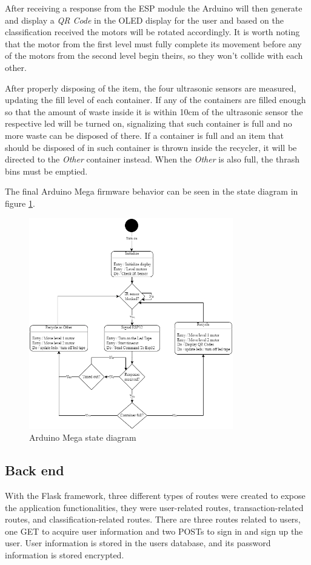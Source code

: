 \documentclass[a4paper,11pt]{article}
\begin{document}
After receiving a response from the ESP module the Arduino will then generate and display a \textit{QR Code} in the OLED display for the user and based on the classification received the motors will be rotated accordingly. It is worth noting that the motor from the first level must fully complete its movement before any of the motors from the second level begin theirs, so they won't collide with each other.

After properly disposing of the item, the four ultrasonic sensors are measured, updating the fill level of each container. If any of the containers are filled enough so that the amount of waste inside it is within 10cm of the ultrasonic sensor the respective led will be turned on, signalizing that such container is full and no more waste can be disposed of there. If a container is full and an item that should be disposed of in such container is thrown inside the recycler, it will be directed to the \textit{Other} container instead. When the \textit{Other} is also full, the thrash bins must be emptied.

The final Arduino Mega firmware behavior can be seen in the state diagram in figure \ref{fig:arduinoState}.

\begin{figure}[H]
  \centering
  \includegraphics[width=8.9cm]{Figures/State chart Arduino Mega.png}
  \caption{\small{Arduino Mega state diagram}}
  \label{fig:arduinoState}
\end{figure}

\subsection{Back end}
With the Flask framework, three different types of routes were created to expose the application functionalities, they were user-related routes, transaction-related routes, and classification-related routes.
There are three routes related to users, one GET to acquire user information and two POSTs to sign in and sign up the user. User information is stored in the users database, and its password information is stored encrypted.
\end{document}
